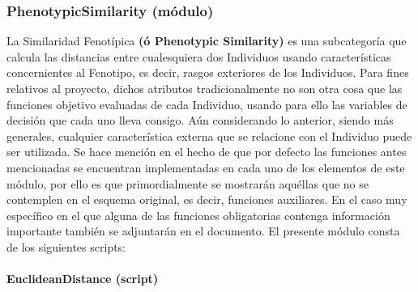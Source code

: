 \documentclass[class=report, crop=false]{standalone}
\begin{document}
\subsubsection{PhenotypicSimilarity (módulo)}
\label{sec:a_2_5_2}
La Similaridad Fenotípica \textbf{(ó Phenotypic Similarity)} 
es una subcategoría que calcula las distancias entre cualesquiera 
dos Individuos usando características concernientes al Fenotipo, 
es decir, rasgos exteriores de los Individuos.\medskip\break
Para fines relativos al proyecto, dichos atributos tradicionalmente 
no son otra cosa que las funciones objetivo evaluadas de cada 
Individuo, usando para ello las variables de decisión que cada uno 
lleva consigo.\break
Aún considerando lo anterior, siendo más generales, cualquier 
característica externa que se relacione con el Individuo puede 
ser utilizada.\medskip\break
Se hace mención en el hecho de que por defecto las funciones antes 
mencionadas se encuentran implementadas en cada uno de los elementos de 
este módulo, por ello es que primordialmente se mostrarán aquéllas que 
no se contemplen en el esquema original, es decir, funciones auxiliares.\break
En el caso muy específico en el que alguna de las funciones obligatorias 
contenga información importante también se adjuntarán en el documento.\medskip\break  
El presente módulo consta de los siguientes scripts:

\paragraph{EuclideanDistance (script)}
\label{sec:a_2_5_2_1}
\end{document}
